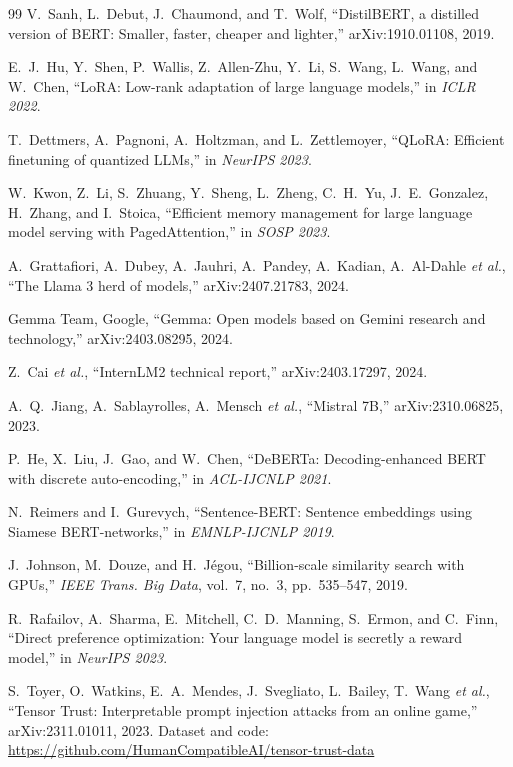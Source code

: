 \begin{thebibliography}{99}
 V.~Sanh, L.~Debut, J.~Chaumond, and T.~Wolf, ``DistilBERT, a distilled version of BERT: Smaller, faster, cheaper and lighter,'' arXiv:1910.01108, 2019.

 E.~J.~Hu, Y.~Shen, P.~Wallis, Z.~Allen-Zhu, Y.~Li, S.~Wang, L.~Wang, and W.~Chen, ``LoRA: Low-rank adaptation of large language models,'' in \textit{ICLR 2022}.

 T.~Dettmers, A.~Pagnoni, A.~Holtzman, and L.~Zettlemoyer, ``QLoRA: Efficient finetuning of quantized LLMs,'' in \textit{NeurIPS 2023}.

 W.~Kwon, Z.~Li, S.~Zhuang, Y.~Sheng, L.~Zheng, C.~H.~Yu, J.~E.~Gonzalez, H.~Zhang, and I.~Stoica, ``Efficient memory management for large language model serving with PagedAttention,'' in \textit{SOSP 2023}.

 A.~Grattafiori, A.~Dubey, A.~Jauhri, A.~Pandey, A.~Kadian, A.~Al-Dahle \textit{et al.}, ``The Llama 3 herd of models,'' arXiv:2407.21783, 2024.

 Gemma Team, Google, ``Gemma: Open models based on Gemini research and technology,'' arXiv:2403.08295, 2024.

 Z.~Cai \textit{et al.}, ``InternLM2 technical report,'' arXiv:2403.17297, 2024.

 A.~Q.~Jiang, A.~Sablayrolles, A.~Mensch \textit{et al.}, ``Mistral 7B,'' arXiv:2310.06825, 2023.

 P.~He, X.~Liu, J.~Gao, and W.~Chen, ``DeBERTa: Decoding-enhanced BERT with discrete auto-encoding,'' in \textit{ACL-IJCNLP 2021}.

 N.~Reimers and I.~Gurevych, ``Sentence-BERT: Sentence embeddings using Siamese BERT-networks,'' in \textit{EMNLP-IJCNLP 2019}.

 J.~Johnson, M.~Douze, and H.~J\'egou, ``Billion-scale similarity search with GPUs,'' \textit{IEEE Trans. Big Data}, vol.~7, no.~3, pp.~535--547, 2019.

 R.~Rafailov, A.~Sharma, E.~Mitchell, C.~D.~Manning, S.~Ermon, and C.~Finn, ``Direct preference optimization: Your language model is secretly a reward model,'' in \textit{NeurIPS 2023}.

 S.~Toyer, O.~Watkins, E.~A.~Mendes, J.~Svegliato, L.~Bailey, T.~Wang \textit{et al.}, ``Tensor Trust: Interpretable prompt injection attacks from an online game,'' arXiv:2311.01011, 2023. Dataset and code: \url{https://github.com/HumanCompatibleAI/tensor-trust-data}

\end{thebibliography}


